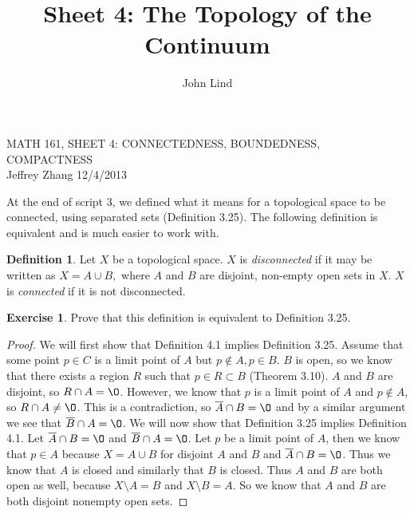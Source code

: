 \documentclass[12pt]{article}
\title{Sheet 4: The Topology of the Continuum}
\author{John Lind}
\renewcommand{\emptyset}{\O}
\renewcommand{\_}[1]{\underline{ #1 }}
\theoremstyle{definition}
\newtheorem{definition}[theorem]{Definition}
\newtheorem{exercise}[theorem]{Exercise}
\numberwithin{equation}{subsection}
\begin{document}
\begin{center}
{\large MATH 161, SHEET 4: CONNECTEDNESS, BOUNDEDNESS, COMPACTNESS} \\ 
\vspace{.2in}  
Jeffrey Zhang 12/4/2013
\end{center}

\bigskip \bigskip


\setcounter{section}{4}   


At the end of script 3, we defined what it means for a topological space to be connected, using separated sets (Definition 3.25).
The following definition is equivalent and is much easier to work with. 

\begin{definition}
Let $X$ be a topological space. $X$ is {\it disconnected} if it may be written as $X=A\cup B,$ where $A$ and $B$ are disjoint, non-empty open sets in $X.$  $X$ is {\it connected} if it is not disconnected.
\end{definition}

\begin{exercise}
Prove that this definition is equivalent to Definition 3.25.
\end{exercise}

\begin{proof}
We will first show that Definition 4.1 implies Definition 3.25. Assume that some point $p \in C$ is a limit point of $A$ but $p \not \in A, p \in B$. $B$ is open, so we know that there exists a region $R$ such that $p \in R \subset B$ (Theorem 3.10). $A$ and $B$ are disjoint, so $R \cap A = \emptyset$. However, we know that $p$ is a limit point of $A$ and $p \not \in A$, so $R \cap A \not = \emptyset$. This is a contradiction, so $\overline{A} \cap B = \emptyset$ and by a similar argument we see that $\overline{B} \cap A = \emptyset$.
We will now show that Definition 3.25 implies Definition 4.1. Let $\overline{A} \cap B = \emptyset$ and $\overline{B} \cap A = \emptyset$. Let $p$ be a limit point of $A$, then we know that $p \in A$ because $X = A \cup B$ for disjoint $A$ and $B$ and $\overline{A} \cap B = \emptyset$. Thus we know that $A$ is closed and similarly that $B$ is closed. Thus $A$ and $B$ are both open as well, because $X \setminus A = B$ and $X \setminus B = A$. So we know that $A$ and $B$ are both disjoint nonempty open sets.
\end{proof}
\end{document}
